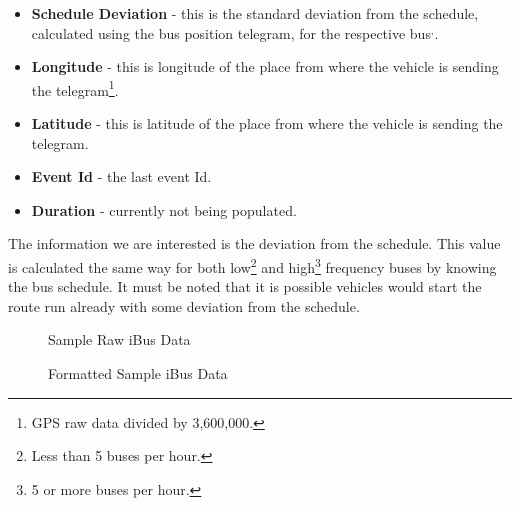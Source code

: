 \begin{itemize}
	\item \textbf{Schedule Deviation} - this is the standard deviation from the schedule, calculated using the bus position telegram, for the respective bus\footnotemark[\ref{loggedProperly}]$^{,}$\footnotemark[\ref{routeVariant}].
	\item \textbf{Longitude} - this is longitude of the place from where the vehicle is sending the telegram\footnote{\label{gps}GPS raw data divided by 3,600,000.}.
	\item \textbf{Latitude} - this is latitude of the place from where the vehicle is sending the telegram\footnotemark[\ref{gps}].
	\item \textbf{Event Id} - the last event Id.
	\item \textbf{Duration} - currently not being populated.
\end{itemize}

The information we are interested is the deviation from the schedule. This value is calculated the same way for both low\footnote{Less than 5 buses per hour.} and high\footnote{5 or more buses per hour.} frequency buses by knowing the bus schedule. It must be noted that it is possible vehicles would start the route run already with some deviation from the schedule.

\begin{figure}[ht!]
	\caption{Sample Raw iBus Data}
\label{fig:rawDataSample}
\end{figure}

\begin{figure}[ht!]
	\caption{Formatted Sample iBus Data}
\label{fig:formattedDataSample}
\end{figure}

\FloatBarrier
